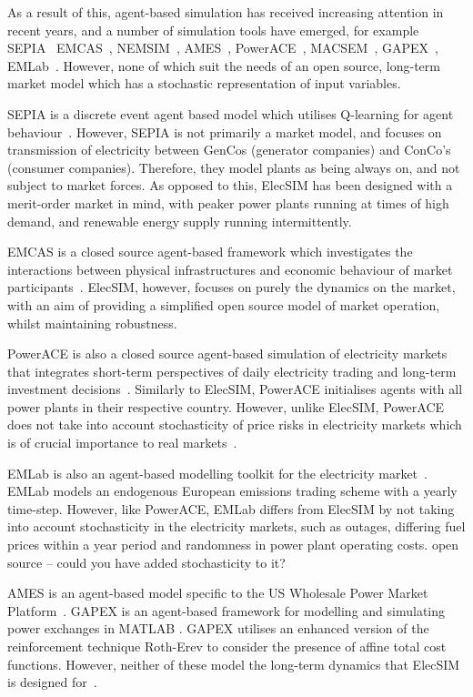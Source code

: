 As a result of this, agent-based simulation has received increasing attention in recent years, and a number of simulation tools have emerged, for example SEPIA~\cite{Kraan2018} EMCAS~\cite{Conzelmann}, NEMSIM~\cite{Batten2006}, AMES~\cite{Sun2007}, PowerACE~\cite{Rothengatter2007}, MACSEM~\cite{Praca2003}, GAPEX~\cite{Cincotti2013}, EMLab~\cite{Chappin2017}. However, none of which suit the needs of an open source, long-term market model which has a stochastic representation of input variables.

SEPIA is a discrete event agent based model which utilises Q-learning for agent behaviour~\cite{Harp2000}. However, SEPIA is not primarily a market model, and focuses on transmission of electricity between GenCos (generator companies) and ConCo's (consumer companies). Therefore, they model plants as being always on, and not subject to market forces. As opposed to this, ElecSIM has been designed with a merit-order market in mind, with peaker power plants running at times of high demand, and renewable energy supply running intermittently.

EMCAS is a closed source agent-based framework which investigates the interactions between physical infrastructures and economic behaviour of market participants~\cite{Conzelmann}. ElecSIM, however, focuses on purely the dynamics on the market, with an aim of providing a simplified open source model of market operation, whilst maintaining robustness.

PowerACE is also a closed source agent-based simulation of electricity markets that integrates short-term perspectives of daily electricity trading and long-term investment decisions~\cite{Rothengatter2007}. Similarly to ElecSIM, PowerACE initialises agents with all power plants in their respective country. However, unlike ElecSIM, PowerACE does not take into account stochasticity of price risks in electricity markets which is of crucial importance to real markets~\cite{Most2010}.

EMLab is also an agent-based modelling toolkit for the electricity market~\cite{Chappin2017}. EMLab models an endogenous European emissions trading scheme with a yearly time-step. However, like PowerACE, EMLab differs from ElecSIM by not taking into account stochasticity in the electricity markets, such as outages, differing fuel prices within a year period and randomness in power plant operating costs. {\color{red} open source -- could you have added stochasticity to it?}

AMES is an agent-based model specific to the US Wholesale Power Market Platform~\cite{Sun2007}. GAPEX is an agent-based framework for modelling and simulating power exchanges in MATLAB \cite{Cincotti2013}. GAPEX utilises an enhanced version of the reinforcement technique Roth-Erev to consider the presence of affine total cost functions. However, neither of these model the long-term dynamics that ElecSIM is designed for~\cite{Cincotti2013}.

